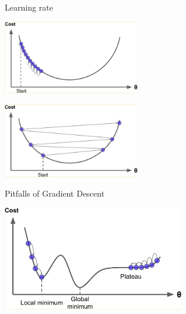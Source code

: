 \documentclass{beamer}
\begin{document}
\begin{frame}
{\centerline{Learning rate}}

\begin{center}
\includegraphics[width=6cm]{P2023.AIBCCSS.FoundationsDataScience/gd-2.png}
\end{center}



\begin{center}
\includegraphics[width=6cm]{P2023.AIBCCSS.FoundationsDataScience/gd-3.png}
\end{center}



\end{frame}
\begin{frame}
{\centerline{Pitfalls of Gradient Descent }}
\begin{center}
\includegraphics[width=8cm]{P2023.AIBCCSS.FoundationsDataScience/gd-4.png}
\end{center}
\end{frame}



\end{document}

